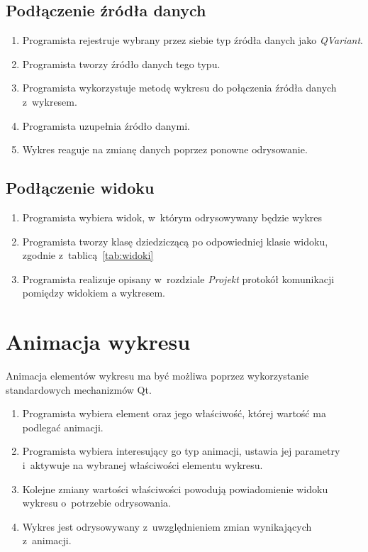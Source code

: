 \subsection{Podłączenie źródła danych}
\begin{enumerate}
\item{Programista rejestruje wybrany przez siebie typ źródła danych jako \textit{QVariant}.}
\item{Programista tworzy źródło danych tego typu.}
\item{Programista wykorzystuje metodę wykresu do połączenia źródła danych z~wykresem.}
\item{Programista uzupełnia źródło danymi.}
\item{Wykres reaguje na zmianę danych poprzez ponowne odrysowanie.}
\end{enumerate}

\subsection{Podłączenie widoku}
\begin{enumerate}
\item{Programista wybiera widok, w~którym odrysowywany będzie wykres}
\item{Programista tworzy klasę dziedziczącą po odpowiedniej klasie widoku, zgodnie z~tablicą~\ref{tab:widoki}}
\item{Programista realizuje opisany w~rozdziale \textit{Projekt} protokół komunikacji pomiędzy widokiem a wykresem.}
\end{enumerate}


\section{Animacja wykresu}
Animacja elementów wykresu ma być możliwa poprzez wykorzystanie standardowych mechanizmów Qt.
\begin{enumerate}
\item{Programista wybiera element oraz jego właściwość, której wartość ma podlegać animacji.}
\item{Programista wybiera interesujący go typ animacji, ustawia jej parametry i~aktywuje na wybranej właściwości elementu wykresu.}
\item{Kolejne zmiany wartości właściwości powodują powiadomienie widoku wykresu o~potrzebie odrysowania.}
\item{Wykres jest odrysowywany z~uwzględnieniem zmian wynikających z~animacji.}
\end{enumerate}

